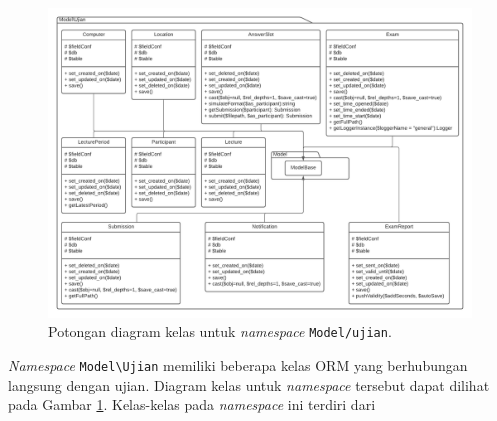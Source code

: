     
    \begin{figure}
        \centering
        \includegraphics[width=0.8\paperheight]{Gambar/classmap-be/Classmap - app-model-ujian.pdf}
        \caption{Potongan diagram kelas untuk \textit{namespace}
        \texttt{Model/ujian}.}
        \label{fig:classmap_app-model-ujian}
    \end{figure}
    \textit{Namespace} \texttt{Model\textbackslash Ujian} memiliki beberapa
    kelas ORM yang berhubungan langsung dengan ujian. Diagram kelas untuk
    \textit{namespace} tersebut dapat dilihat pada Gambar
    \ref{fig:classmap_app-model-ujian}. Kelas-kelas pada \textit{namespace} ini
    terdiri dari
